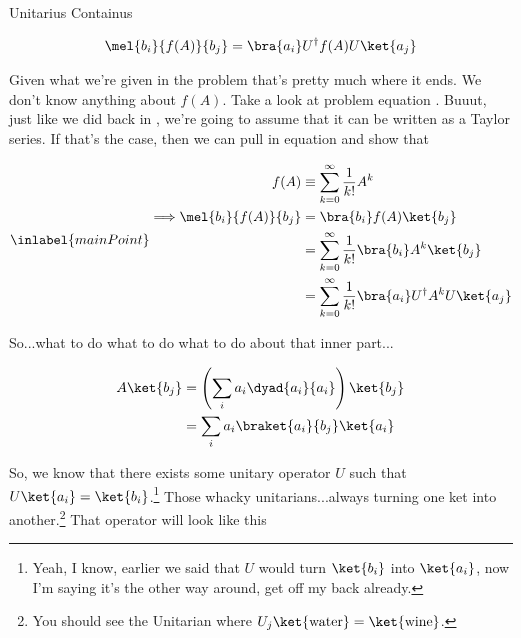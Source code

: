 \begin{answer}

  \begin{answerpart}{Unitarius Containus}

    \begin{equation}
      \begin{split}
        \mel{b_i}{f(A)}{b_j}
        &= \bra{a_i}U^\dagger f(A)U\ket{a_j}\\
      \end{split}
    \end{equation}

  Given what we're given in the problem that's pretty much where it
  ends.  We don't know anything about $f(A)$.  Take a look at problem
   equation .  Buuut,
  just like we did back in , we're going to
  assume that it can be written as a Taylor series.  If that's the
  case, then we can pull in equation  and
  show that

  \begin{equation}
    \inlabel{mainPoint}
    \begin{alignedat}{2}
      &&f(A)
      &\equiv \sum_{k=0}^{\infty} \frac{1}{k!} A^k
      \\
      \implies &&
      \mel{b_i}{f(A)}{b_j}
      &= \bra{b_i}f(A)\ket{b_j}
      \\
      &&&=
      \sum_{k=0}^{\infty} \frac{1}{k!} \bra{b_i}A^k\ket{b_j}
      \\
      &&&=
      \sum_{k=0}^{\infty} \frac{1}{k!} \bra{a_i} U^\dagger A^k U \ket{a_j}
      \\
    \end{alignedat}
  \end{equation}

  So...what to do what to do what to do about that inner part...

  \begin{equation}
    \begin{alignedat}{2}
      &&A\ket{b_j}
      &= \left(\sum_i a_i\dyad{a_i}{a_i}\right)\ket{b_j}\\
      &&&= \sum_i a_i\braket{a_i}{b_j}\ket{a_i}\\
    \end{alignedat}
  \end{equation}

  So, we know that there exists some unitary operator $U$ such that
  $U\ket{a_i} = \ket{b_i}$.\footnote{Yeah, I know, earlier we said
  that $U$ would turn $\ket{b_i}$ into $\ket{a_i}$, now I'm saying
  it's the other way around, get off my back already.}  Those whacky
  unitarians...always turning one ket into another.\footnote{You
  should see the Unitarian where $U_j\ket{\text{water}} =
  \ket{\text{wine}}$.}  That operator will look like this


\end{answerpart}
\end{answer}
